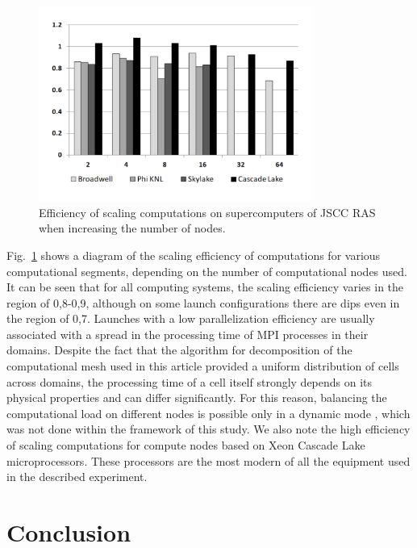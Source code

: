 \documentclass[
11pt,%
tightenlines,%
twoside,%
onecolumn,%
nofloats,%
nobibnotes,%
nofootinbib,%
superscriptaddress,%
noshowpacs,%
centertags]%
{revtex4}
\begin{document}
\begin{figure}[h]
\includegraphics[width=0.8\textwidth]{pics/scaling.pdf}
\caption{Efficiency of scaling computations on supercomputers of JSCC RAS when increasing the number of nodes.}\label{fig:speedup}
\end{figure}

Fig.~\ref{fig:speedup} shows a diagram of the scaling efficiency of computations for various computational segments, depending on the number of computational nodes used.
It can be seen that for all computing systems, the scaling efficiency varies in the region of 0,8-0,9, although on some launch configurations there are dips even in the region of 0,7.
Launches with a low parallelization efficiency are usually associated with a spread in the processing time of MPI processes in their domains.
Despite the fact that the algorithm for decomposition of the computational mesh used in this article provided a uniform distribution of cells across domains, the processing time of a cell itself strongly depends on its physical properties and can differ significantly.
For this reason, balancing the computational load on different nodes is possible only in a dynamic mode \cite{Van_DynamicLoadBalance}, which was not done within the framework of this study.
We also note the high efficiency of scaling computations for compute nodes based on Xeon Cascade Lake microprocessors.
These processors are the most modern of all the equipment used in the described experiment.

\section{Conclusion}
\end{document}
